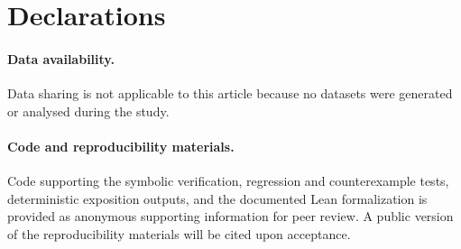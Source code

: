 \section*{Declarations}

\paragraph{Data availability.}
Data sharing is not applicable to this article because no datasets were generated or analysed during the study.

\paragraph{Code and reproducibility materials.}
Code supporting the symbolic verification, regression and counterexample tests, deterministic exposition outputs, and the documented Lean formalization is provided as anonymous supporting information for peer review. A public version of the reproducibility materials will be cited upon acceptance.
